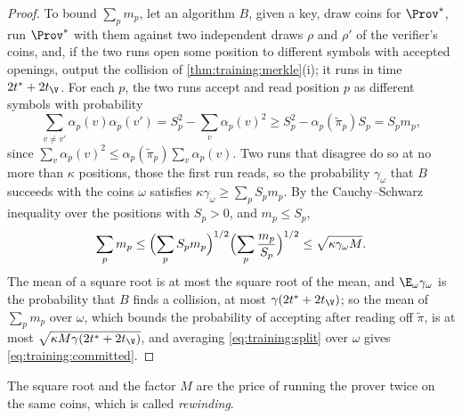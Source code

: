 \begin{refsection}
\begin{proof}
To bound $\sum_pm_p$, let an algorithm $B$, given a key, draw coins for $\Prov^*$, run $\Prov^*$ with them against two independent draws $\rho$ and $\rho'$ of the verifier's coins, and, if the two runs open some position to different symbols with accepted openings, output the collision of \cref{thm:training:merkle}(i); it runs in time $2t^*+2t_{\V}$. For each $p$, the two runs accept and read position $p$ as different symbols with probability
\[\sum_{v\ne v'}\alpha_p(v)\alpha_p(v')=S_p^2-\sum_v\alpha_p(v)^2\ge S_p^2-\alpha_p(\tilde\pi_p)S_p=S_pm_p,\]
since $\sum_v\alpha_p(v)^2\le\alpha_p(\tilde\pi_p)\sum_v\alpha_p(v)$. Two runs that disagree do so at no more than $\kappa$ positions, those the first run reads, so the probability $\gamma_\omega$ that $B$ succeeds with the coins $\omega$ satisfies $\kappa\gamma_\omega\ge\sum_pS_pm_p$. By the Cauchy--Schwarz inequality over the positions with $S_p>0$, and $m_p\le S_p$,
\[\sum_pm_p\le\Bigl(\sum_pS_pm_p\Bigr)^{1/2}\Bigl(\sum_p\frac{m_p}{S_p}\Bigr)^{1/2}\le\sqrt{\kappa\gamma_\omega M}.\]
The mean of a square root is at most the square root of the mean, and $\E_\omega\gamma_\omega$ is the probability that $B$ finds a collision, at most $\gamma(2t^*+2t_{\V})$; so the mean of $\sum_pm_p$ over $\omega$, which bounds the probability of accepting after reading off $\tilde\pi$, is at most $\sqrt{\kappa M\gamma(2t^*+2t_{\V})}$, and averaging \eqref{eq:training:split} over $\omega$ gives \eqref{eq:training:committed}.
\end{proof}

The square root and the factor $M$ are the price of running the prover twice on the same coins, which is called \emph{rewinding}.


\end{refsection}
